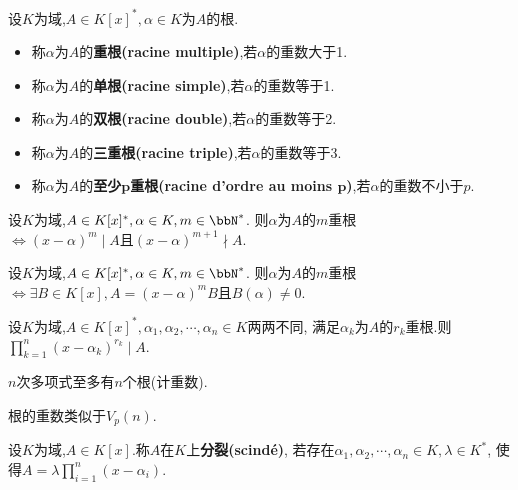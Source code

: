 \begin{rqq}
    设$K$为域,$A \in K[x]^*, \alpha \in K$为$A$的根.
    \begin{itemize}
        \item 称$\alpha$为$A$的\textbf{重根(racine multiple)},若$\alpha$的重数大于1.
        \item 称$\alpha$为$A$的\textbf{单根(racine simple)},若$\alpha$的重数等于1.
        \item 称$\alpha$为$A$的\textbf{双根(racine double)},若$\alpha$的重数等于2.
        \item 称$\alpha$为$A$的\textbf{三重根(racine triple)},若$\alpha$的重数等于3.
        \item 称$\alpha$为$A$的\textbf{至少$\boldsymbol{p}$重根(racine d'ordre au moins $\boldsymbol{p}$)},若$\alpha$的重数不小于$p$.
    \end{itemize} 
\end{rqq}

\begin{prop}
    设$K$为域,$A \in K[x]^*, \alpha \in K, m \in \bbN^*$.
    则$\alpha$为$A$的$m$重根$\iff (x - \alpha)^m \mid A \text{且} (x - \alpha)^{m + 1} \nmid A$.
\end{prop}

\begin{prop}
    设$K$为域,$A \in K[x]^*, \alpha \in K, m \in \bbN^*$.
    则$\alpha$为$A$的$m$重根$\iff \exists B \in K[x], A = (x - \alpha)^m B \text{且} B(\alpha) \neq 0$.
\end{prop}

\begin{prop}
    设$K$为域,$A \in K[x]^*, \alpha_1, \alpha_2, \cdots, \alpha_n \in K$两两不同,
    满足$\alpha_k$为$A$的$r_k$重根.则$\prod\limits_{k=1}^n (x - \alpha_k)^{r_k} \mid A$.
\end{prop}

\begin{cor}
    $n$次多项式至多有$n$个根(计重数).
\end{cor}

\begin{rqq}
    根的重数类似于$V_p(n)$.
\end{rqq}

\begin{deff}\label{def:scindé}
    设$K$为域,$A \in K[x]$.称$A$在$K$上\textbf{分裂(scindé)},
    若存在$\alpha_1, \alpha_2, \cdots, \alpha_n \in K, \lambda \in K^*$,
    使得$A = \lambda \prod\limits_{i = 1}^n (x - \alpha_i)$.
\end{deff}

